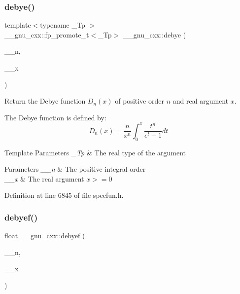 \subsubsection{\texorpdfstring{debye()}{debye()}}
{\footnotesize\ttfamily template$<$typename \+\_\+\+Tp $>$ \\
\+\_\+\+\_\+gnu\+\_\+cxx\+::fp\+\_\+promote\+\_\+t$<$\+\_\+\+Tp$>$ \+\_\+\+\_\+gnu\+\_\+cxx\+::debye (\begin{DoxyParamCaption}\item[{unsigned int}]{\+\_\+\+\_\+n,  }\item[{\+\_\+\+Tp}]{\+\_\+\+\_\+x }\end{DoxyParamCaption})\hspace{0.3cm}{\ttfamily [inline]}}

Return the Debye function $ D_n(x) $ of positive order $ n $ and real argument $ x $.

The Debye function is defined by\+: \[ D_n(x) = \frac{n}{x^n}\int_{0}^{x}\frac{t^n}{e^t-1}dt \]


\begin{DoxyTemplParams}{Template Parameters}
{\em \+\_\+\+Tp} & The real type of the argument \\
\hline
\end{DoxyTemplParams}

\begin{DoxyParams}{Parameters}
{\em \+\_\+\+\_\+n} & The positive integral order \\
\hline
{\em \+\_\+\+\_\+x} & The real argument $ x >= 0 $ \\
\hline
\end{DoxyParams}


Definition at line 6845 of file specfun.\+h.

\mbox{\label{group__gnu__math__spec__func_ga683d3a885913b52db128aa5d624984a4}} 
\subsubsection{\texorpdfstring{debyef()}{debyef()}}
{\footnotesize\ttfamily float \+\_\+\+\_\+gnu\+\_\+cxx\+::debyef (\begin{DoxyParamCaption}\item[{unsigned int}]{\+\_\+\+\_\+n,  }\item[{float}]{\+\_\+\+\_\+x }\end{DoxyParamCaption})\hspace{0.3cm}{\ttfamily [inline]}}

